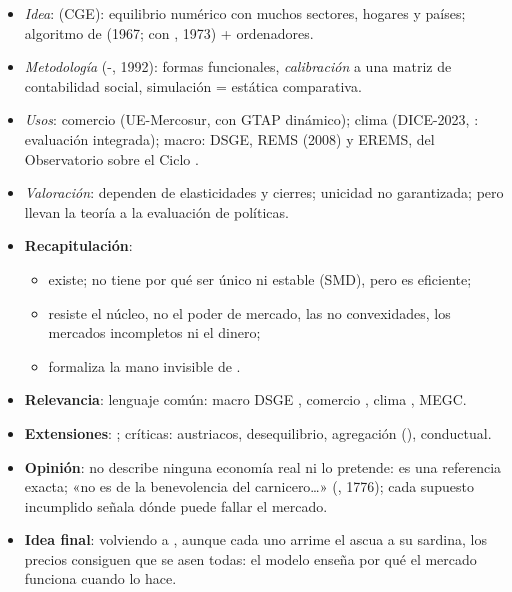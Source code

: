 \documentclass{article}
\begin{document}
\begin{columnas}
\begin{itemize}
\item \emph{Idea}:  (CGE): equilibrio numérico con muchos sectores, hogares y países; algoritmo de  (1967; con , 1973) + ordenadores.
\item \emph{Metodología} (-, 1992): formas funcionales, \emph{calibración} a una matriz de contabilidad social, simulación = estática comparativa.
\item \emph{Usos}: comercio (UE-Mercosur, con GTAP dinámico); clima (DICE-2023, : evaluación integrada); macro: DSGE, REMS (2008) y EREMS, del Observatorio sobre el Ciclo .
\item \emph{Valoración}: dependen de elasticidades y cierres; unicidad no garantizada; pero llevan la teoría a la evaluación de políticas.
\end{itemize}

\begin{itemize}
\item \textbf{Recapitulación}:
  \begin{itemize}
  \item existe; no tiene por qué ser único ni estable (SMD), pero es eficiente;
  \item resiste el núcleo, no el poder de mercado, las no convexidades, los mercados incompletos ni el dinero;
  \item {} formaliza la mano invisible de .
  \end{itemize}
\item \textbf{Relevancia}: lenguaje común: macro DSGE , comercio , clima , MEGC.
\item \textbf{Extensiones}:    ; críticas: austriacos, desequilibrio, agregación (), conductual.
\item \textbf{Opinión}: no describe ninguna economía real ni lo pretende: es una referencia exacta; «no es de la benevolencia del carnicero…» (, 1776); cada supuesto incumplido señala dónde puede fallar el mercado.
\item \textbf{Idea final}: volviendo a , aunque cada uno arrime el ascua a su sardina, los precios consiguen que se asen todas: el modelo enseña por qué el mercado funciona cuando lo hace.
\end{itemize}


\end{columnas}
\end{document}
